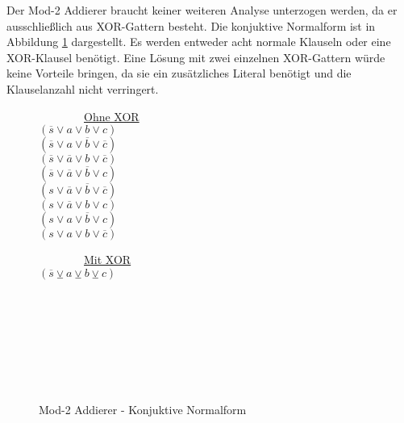 Der Mod-2 Addierer braucht keiner weiteren Analyse unterzogen werden, da er ausschließlich aus XOR-Gattern besteht.
Die konjuktive Normalform ist in Abbildung \ref{fig:lastadder_cnf} dargestellt. Es werden entweder acht normale Klauseln
oder eine XOR-Klausel benötigt. Eine Lösung mit zwei einzelnen XOR-Gattern würde keine Vorteile bringen, da sie ein
zusätzliches Literal benötigt und die Klauselanzahl nicht verringert.
\begin{figure}[!h]
  \centering
  \begin{minipage}[l]{5cm}
    ~~~~~~~~\underline{Ohne XOR}\\
    $ (\overline{s} \vee a \vee b \vee c) $\\
    $ (\overline{s} \vee a \vee \overline{b} \vee \overline{c}) $\\
    $ (\overline{s} \vee \overline{a} \vee b \vee \overline{c}) $\\
    $ (\overline{s} \vee \overline{a} \vee \overline{b} \vee c) $\\
    $ (s \vee \overline{a} \vee \overline{b} \vee \overline{c}) $\\
    $ (s \vee \overline{a} \vee b \vee c) $\\
    $ (s \vee a \vee \overline{b} \vee c) $\\
    $ (s \vee a \vee b \vee \overline{c}) $
  \end{minipage}
  \begin{minipage}[l]{5cm}
    ~~~~~~~~\underline{Mit XOR}\\
    $ (\overline{s} \veebar a \veebar b \veebar c) $\\
    ~\\
    ~\\
    ~\\
    ~\\
    ~\\
    ~\\
    ~
  \end{minipage}
  \caption{Mod-2 Addierer - Konjuktive Normalform}
  \label{fig:lastadder_cnf}
\end{figure}

